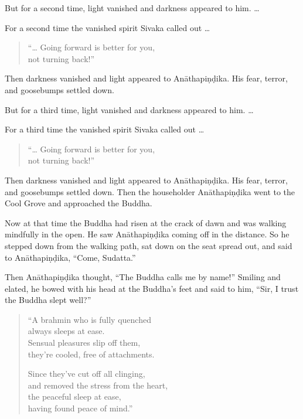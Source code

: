 \documentclass[12pt,openany]{book}%
\begin{document}
But for a second time, light vanished and darkness appeared to him. … 

For a second time the vanished spirit Sivaka called out … 

\begin{verse}%
“… Going forward is better for you, \\
not turning back!” 

%
\end{verse}

Then darkness vanished and light appeared to \textsanskrit{Anāthapiṇḍika}. His fear, terror, and goosebumps settled down. 

But for a third time, light vanished and darkness appeared to him. … 

For a third time the vanished spirit Sivaka called out … 

\begin{verse}%
“… Going forward is better for you, \\
not turning back!” 

%
\end{verse}

Then darkness vanished and light appeared to \textsanskrit{Anāthapiṇḍika}. His fear, terror, and goosebumps settled down. Then the householder \textsanskrit{Anāthapiṇḍika} went to the Cool Grove and approached the Buddha. 

Now at that time the Buddha had risen at the crack of dawn and was walking mindfully in the open. He saw \textsanskrit{Anāthapiṇḍika} coming off in the distance. So he stepped down from the walking path, sat down on the seat spread out, and said to \textsanskrit{Anāthapiṇḍika}, “Come, Sudatta.” 

Then \textsanskrit{Anāthapiṇḍika} thought, “The Buddha calls me by name!” Smiling and elated, he bowed with his head at the Buddha’s feet and said to him, “Sir, I trust the Buddha slept well?” 

\begin{verse}%
“A brahmin who is fully quenched \\
always sleeps at ease. \\
Sensual pleasures slip off them, \\
they’re cooled, free of attachments. 

Since they’ve cut off all clinging, \\
and removed the stress from the heart, \\
the peaceful sleep at ease, \\
having found peace of mind.” 

%
\end{verse}
\end{document}
